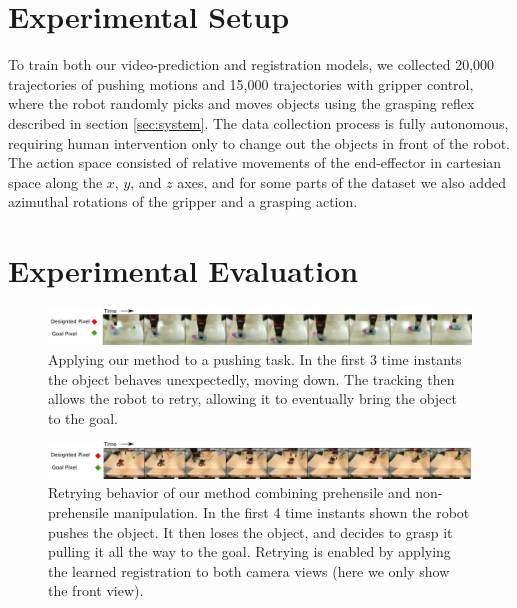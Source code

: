 \section{Experimental Setup}
\label{sec:experiment_setup}
To train both our video-prediction and registration models, we collected 20,000 trajectories of pushing motions and 15,000 trajectories with gripper control, where the robot randomly picks and moves objects using the grasping reflex described in section \ref{sec:system}. The data collection process is fully autonomous, requiring human intervention only to change out the objects in front of the robot. The action space consisted of relative movements of the end-effector in cartesian space along the $x$, $y$, and $z$ axes, and for some parts of the dataset we also added azimuthal rotations of the gripper and a grasping action.

\section{Experimental Evaluation}

\begin{figure}
    \centering    \includegraphics[width=1.0\textwidth]{images_rfr/push_correction.pdf}
    \caption{\small{Applying our method to a pushing task. In the first 3 time instants the object behaves unexpectedly, moving down. The tracking then allows the robot to retry, allowing it to eventually bring the object to the goal.}}
    \label{fig:push_retry}
\end{figure}

\begin{figure}
	\centering
	\includegraphics[width=1.0\textwidth]{images_rfr/pick_place_plush.pdf}
	\caption{\small{Retrying behavior of our method combining prehensile and non-prehensile manipulation. In the first 4 time instants shown the robot pushes the object. It then loses the object, and decides to grasp it pulling it all the way to the goal. Retrying is enabled by applying the learned registration to both camera views (here we only show the front view).}}
	\label{fig:push_grasp}
\end{figure}

